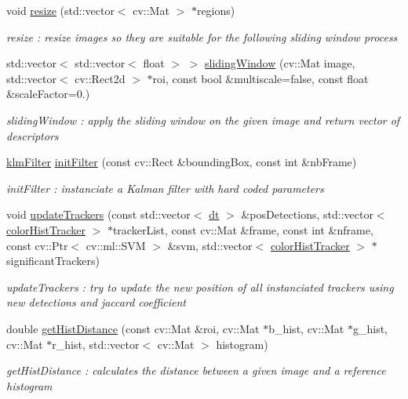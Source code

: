 \begin{DoxyCompactItemize}
void \hyperlink{classBgsubTrack_ac7aac2c7fbad37769597fc0898e869a3}{resize} (std\+::vector$<$ cv\+::\+Mat $>$ $\ast$regions)
\begin{DoxyCompactList}\small\item\em resize \+: resize images so they are suitable for the following sliding window process \end{DoxyCompactList}\item 
std\+::vector$<$ std\+::vector$<$ float $>$ $>$ \hyperlink{classBgsubTrack_a1e50a7b63e41aa49cf5575e42daf8a5f}{sliding\+Window} (cv\+::\+Mat image, std\+::vector$<$ cv\+::\+Rect2d $>$ $\ast$roi, const bool \&multiscale=false, const float \&scale\+Factor=0.)
\begin{DoxyCompactList}\small\item\em sliding\+Window \+: apply the sliding window on the given image and return vector of descriptors \end{DoxyCompactList}\item 
\hyperlink{structklmFilter}{klm\+Filter} \hyperlink{classBgsubTrack_aafe20a3a749ce57587e90c6a6129993d}{init\+Filter} (const cv\+::\+Rect \&bounding\+Box, const int \&nb\+Frame)
\begin{DoxyCompactList}\small\item\em init\+Filter \+: instanciate a Kalman filter with hard coded parameters \end{DoxyCompactList}\item 
void \hyperlink{classBgsubTrack_a25bff01ee6cf3fd85ee9a44298a94766}{update\+Trackers} (const std\+::vector$<$ \hyperlink{structdt}{dt} $>$ \&pos\+Detections, std\+::vector$<$ \hyperlink{structcolorHistTracker}{color\+Hist\+Tracker} $>$ $\ast$tracker\+List, const cv\+::\+Mat \&frame, const int \&nframe, const cv\+::\+Ptr$<$ cv\+::ml\+::\+S\+VM $>$ \&svm, std\+::vector$<$ \hyperlink{structcolorHistTracker}{color\+Hist\+Tracker} $>$ $\ast$significant\+Trackers)
\begin{DoxyCompactList}\small\item\em update\+Trackers \+: try to update the new position of all instanciated trackers using new detections and jaccard coefficient \end{DoxyCompactList}\item 
double \hyperlink{classBgsubTrack_a1accbad4f04e3b759b6a571449e4e0c4}{get\+Hist\+Distance} (const cv\+::\+Mat \&roi, cv\+::\+Mat $\ast$b\+\_\+hist, cv\+::\+Mat $\ast$g\+\_\+hist, cv\+::\+Mat $\ast$r\+\_\+hist, std\+::vector$<$ cv\+::\+Mat $>$ histogram)
\begin{DoxyCompactList}\small\item\em get\+Hist\+Distance \+: calculates the distance between a given image and a reference histogram \end{DoxyCompactList}\item 

\end{DoxyCompactItemize}
